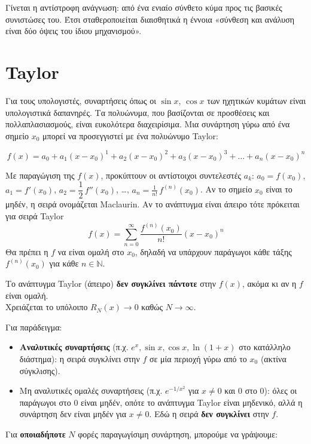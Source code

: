 \documentclass[a4paper, 11pt]{article}
\providecommand{\tightlist}{\setlength{\itemsep}{0pt}\setlength{\parskip}{0pt}}
\begin{document}
Γίνεται η αντίστροφη ανάγνωση: από ένα ενιαίο σύνθετο κύμα προς τις
βασικές συνιστώσες του. Έτσι σταθεροποιείται διαισθητικά η έννοια
«σύνθεση και ανάλυση είναι δύο όψεις του ίδιου μηχανισμού».

\section{Taylor}\label{taylor}

Για τους υπολογιστές, συναρτήσεις όπως οι \(\sin x\), \(\cos x\) των
ηχητικών κυμάτων είναι υπολογιστικά δαπανηρές. Τα πολυώνυμα, που
βασίζονται σε προσθέσεις και πολλαπλασιασμούς, είναι ευκολότερα
διαχειρίσιμα. Μια συνάρτηση γύρω από ένα σημείο \(x_0\) μπορεί να
προσεγγιστεί με ένα πολυώνυμο Taylor:

\[
f(x) = a_0 + a_1(x - x_0)^1 + a_2(x - x_0)^2 + a_3(x - x_0)^3 + \dots + a_n(x - x_0)^n
\]

Με παραγώγιση της \(f(x)\), προκύπτουν οι αντίστοιχοι συντελεστές
\(a_k\): \(a_0 = f(x_0)\), \(a_1 = f'(x_0)\),
\(a_2 = \dfrac{1}{2}\,f''(x_0)\), \ldots,
\(a_n = \frac{1}{n!}\,f^{(n)}(x_0)\). Αν το σημείο \(x_0\) είναι το
μηδέν, η σειρά ονομάζεται Maclaurin. Αν το ανάπτυγμα είναι άπειρο τότε
πρόκειται για σειρά Taylor \[
f(x) = \sum_{n=0}^{\infty} \frac{f^{(n)}(x_0)}{n!} (x - x_0)^n
\] Θα πρέπει η \(f\) να είναι ομαλή στο \(x_0\), δηλαδή να υπάρχουν
παράγωγοι κάθε τάξης \(f^{(n)}(x_0)\) για κάθε \(n \in \mathbb{N}\).

Το ανάπτυγμα Taylor (άπειρο) \textbf{δεν συγκλίνει πάντοτε} στην
\(f(x)\), ακόμα κι αν η \(f\) είναι ομαλή.\\
Χρειάζεται το υπόλοιπο \(R_N(x) \to 0\) καθώς \(N \to \infty\).

Για παράδειγμα:

\begin{itemize}
\tightlist
\item
  \textbf{Αναλυτικές συναρτήσεις} (π.χ.
  \(e^x, \sin x, \cos x, \ln(1+x)\) στο κατάλληλο διάστημα): η σειρά
  συγκλίνει στην \(f\) σε μία περιοχή γύρω από το \(x_0\) (ακτίνα
  σύγκλισης).
\item
  Μη αναλυτικές ομαλές συναρτήσεις (π.χ. \(e^{-1/x^2}\) για \(x \neq 0\)
  και \(0\) στο \(0\)): όλες οι παράγωγοι στο \(0\) είναι μηδέν, οπότε
  το ανάπτυγμα Taylor είναι μηδενικό, αλλά η συνάρτηση δεν είναι μηδέν
  για \(x \neq 0\). Εδώ η σειρά \textbf{δεν συγκλίνει} στην \(f\).
\end{itemize}

Για \textbf{οποιαδήποτε} \(N\) φορές παραγωγίσιμη συνάρτηση, μπορούμε να
γράψουμε:
\end{document}
